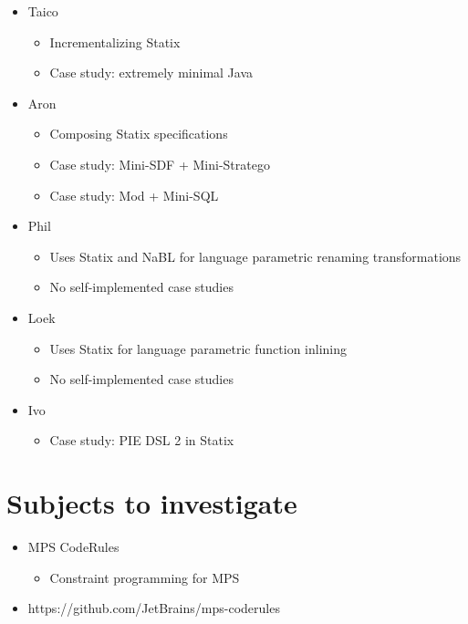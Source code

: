       \begin{itemize}
        \item Taico
        \begin{itemize}
          \item Incrementalizing Statix
          \item Case study: extremely minimal Java
        \end{itemize}
        \item Aron
        \begin{itemize}
          \item Composing Statix specifications
          \item Case study: Mini-SDF + Mini-Stratego
          \item Case study: Mod + Mini-SQL
        \end{itemize}
        \item Phil
        \begin{itemize}
          \item Uses Statix and NaBL for language parametric renaming transformations
          \item No self-implemented case studies
        \end{itemize}
        \item Loek
        \begin{itemize}
          \item Uses Statix for language parametric function inlining
          \item No self-implemented case studies
        \end{itemize}
        \item Ivo
        \begin{itemize}
          \item Case study: PIE DSL 2 in Statix
        \end{itemize}
      \end{itemize}

  \section{Subjects to investigate}

    \begin{itemize}
      \item MPS CodeRules
      \begin{itemize}
        \item Constraint programming for MPS
      \end{itemize}
      \item https://github.com/JetBrains/mps-coderules
    \end{itemize}

